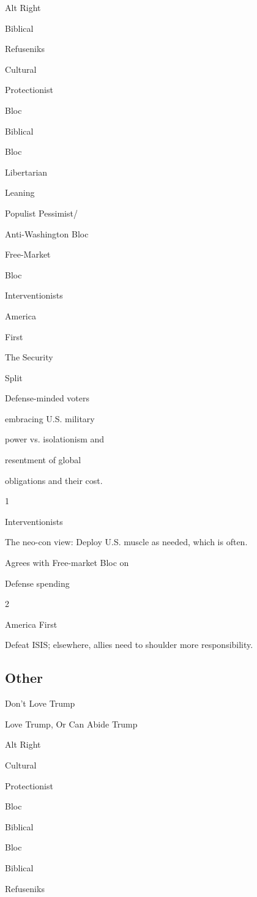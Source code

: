 Alt Right

Biblical

Refuseniks

Cultural

Protectionist

Bloc

Biblical

Bloc

Libertarian

Leaning

Populist Pessimist/

Anti-Washington Bloc

Free-Market

Bloc

Interventionists

America

First

The Security

Split

Defense-minded voters

embracing U.S. military

power vs. isolationism and

resentment of global

obligations and their cost.

1

Interventionists

The neo-con view: Deploy U.S. muscle as needed, which is often.

Agrees with Free-market Bloc on

Defense spending

2

America First

Defeat ISIS; elsewhere, allies need to shoulder more responsibility.

\hypertarget{other}{%
\subsection{Other}\label{other}}

Don't Love Trump

Love Trump, Or Can Abide Trump

Alt Right

Cultural

Protectionist

Bloc

Biblical

Bloc

Biblical

Refuseniks

